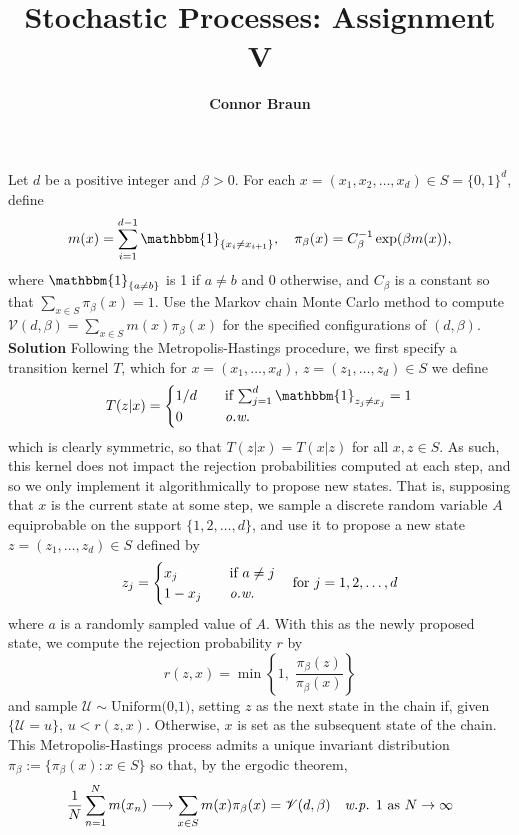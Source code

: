 \documentclass[11pt, letterpaper]{article}
\title{\bf Stochastic Processes: Assignment V}
\author{\bf Connor Braun}
\date{}
\newcommand{\mc}[1]{\mathcal{#1}}
\begin{document}
    \maketitle
     Let $d$ be a positive integer and $\beta>0$. For each $x=(x_1,x_2,\dots,x_d)\in S=\{0,1\}^d$, define
    \[m(x)=\sum_{i=1}^{d-1}\mathbbm{1}_{\{x_i\neq x_{i+1}\}},\quad\pi_\beta(x)=C^{-1}_\beta\exp(\beta m(x)),\]
    where $\mathbbm{1}_{\{a\neq b\}}$ is 1 if $a\neq b$ and $0$ otherwise, and $C_\beta$ is a constant so that $\sum_{x\in S}\pi_\beta(x)=1$.
    Use the Markov chain Monte Carlo method to compute $\mc{V}(d,\beta)=\sum_{x\in S}m(x)\pi_\beta(x)$ for the specified configurations of $(d,\beta)$.\\[10pt]
    {\bf Solution} Following the Metropolis-Hastings procedure, we first specify a transition kernel $T$, which for $x=(x_1,\dots,x_d),\,z=(z_1,\dots,z_d)\in S$
    we define
    \[T(z|x)=\begin{cases}
        1/d\quad&\text{if $\sum_{j=1}^d\mathbbm{1}_{z_j\neq x_j}=1$}\\
        0\quad&\text{{\it o.w.}}
    \end{cases}\]
    which is clearly symmetric, so that $T(z|x)=T(x|z)$ for all $x,z\in S$. As such, this kernel does not impact 
    the rejection probabilities computed at each step, and so we only implement it algorithmically to propose new states. That is,
    supposing that $x$ is the current state at some step, we sample a discrete random variable $A$ equiprobable on the support $\{1,2,\dots,d\}$, and use it to propose
    a new state $z=(z_1,\dots,z_d)\in S$ defined by
    \[z_j=\begin{cases}
        x_j\quad&\text{if $a\neq j$}\\
        1 - x_j\quad&\text{{\it o.w.}}
    \end{cases}\quad\text{for $j=1,2,\dots, d$}\]
    where $a$ is a randomly sampled value of $A$. With this as the newly proposed state, we compute the rejection probability $r$ by
    \[r(z,x)=\min\left\{1,\;\frac{\pi_\beta(z)}{\pi_\beta(x)}\right\}\]
    and sample $\mc{U}\sim\text{Uniform(0,1)}$, setting $z$ as the next state in the chain if, given $\{\mc{U}=u\}$, $u<r(z,x)$. Otherwise, $x$ is set as the subsequent
    state of the chain. This Metropolis-Hastings process admits a unique invariant distribution $\pi_\beta:=\{\pi_\beta(x):x\in S\}$ so that, by the ergodic theorem,
    \[\frac{1}{N}\sum_{n=1}^Nm(x_n)\longrightarrow \sum_{x\in S}m(x)\pi_\beta(x)=\mc{V}(d,\beta)\quad\text{{\it w.p.} 1 as $N\rightarrow\infty$}\]
\end{document}
